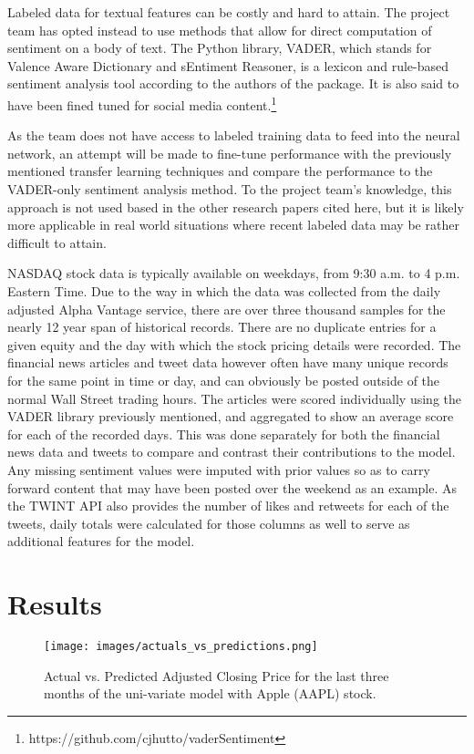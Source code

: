 \documentclass{llncs}
\begin{document}
Labeled data for textual features can be costly and hard to attain.  The project team has opted instead to use methods that allow for direct computation of sentiment on a body of text.  The Python library, VADER, which stands for Valence Aware Dictionary and sEntiment Reasoner, is a lexicon and rule-based sentiment analysis tool according to the authors of the package.  It is also said to have been fined tuned for social media content.\footnote{https://github.com/cjhutto/vaderSentiment}

As the team does not have access to labeled training data to feed into the neural network, an attempt will be made to fine-tune performance with the previously mentioned transfer learning techniques and compare the performance to the VADER-only sentiment analysis method.  To the project team's knowledge, this approach is not used based in the other research papers cited here, but it is likely more applicable in real world situations where recent labeled data may be rather difficult to attain.

NASDAQ stock data is typically available on weekdays, from 9:30 a.m. to 4 p.m. Eastern Time.  Due to the way in which the data was collected from the daily adjusted Alpha Vantage service, there are over three thousand samples for the nearly 12 year span of historical records.  There are no duplicate entries for a given equity and the day with which the stock pricing details were recorded.  The financial news articles and tweet data however often have many unique records for the same point in time or day, and can obviously be posted outside of the normal Wall Street trading hours.  The articles were scored individually using the VADER library previously mentioned, and aggregated to show an average score for each of the recorded days.  This was done separately for both the financial news data and tweets to compare and contrast their contributions to the model.  Any missing sentiment values were imputed with prior values so as to carry forward content that may have been posted over the weekend as an example.  As the TWINT API also provides the number of likes and retweets for each of the tweets, daily totals were calculated for those columns as well to serve as additional features for the model.


\section{Results}


\begin{figure}[ht!]
    \centering
    \texttt{[image: images/actuals\_vs\_predictions.png]}
    \caption{Actual vs. Predicted Adjusted Closing Price for the last three months of the uni-variate model with Apple (AAPL) stock.}
    \label{fig:actuals_vs_predictions}
    \hfill
\end{figure}
\end{document}
